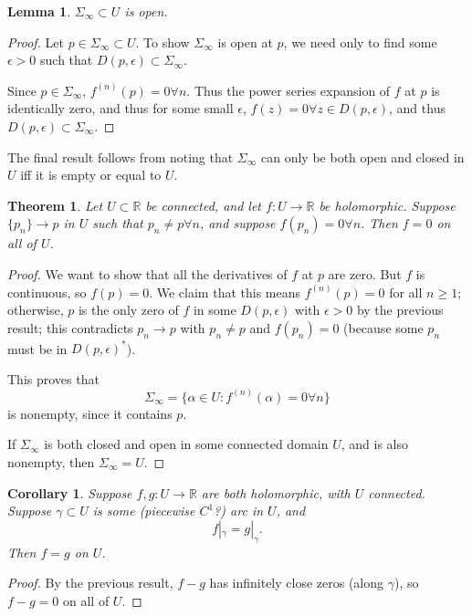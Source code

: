 \documentclass{artikel3}
\newcommand{\complex}{\mathbb{R}}
\newtheorem{lem}{Lemma}
\newtheorem{thm}{Theorem}
\newtheorem{cor}{Corollary}
\numberwithin{equation}{enumi}
\begin{document}
\begin{lem}
	$\Sigma_\infty\subset U$ is open.
\end{lem}
\begin{proof}
	Let $p\in \Sigma_\infty\subset U$.  To show $\Sigma_\infty$ is open at $p$,
	we need only to find some $\epsilon>0$ such that $D(p,\epsilon)\subset \Sigma_\infty$.
	
	Since $p\in \Sigma_\infty$, $f^{(n)}(p)=0\forall n$.  Thus the power
	series expansion of $f$ at $p$ is identically zero, and thus for some small $\epsilon$,
	$f(z)=0\forall z\in D(p,\epsilon)$, and thus $D(p,\epsilon)\subset \Sigma_\infty$.
\end{proof}

The final result follows from noting that $\Sigma_\infty$ can only be both
open and closed in $U$ iff it is empty or equal to $U$.

\begin{thm}
	Let $U\subset\complex$ be connected, and let $f:U\to\complex$ be holomorphic.
	Suppose $\{p_n\}\to p$ in $U$ such that $p_n\neq p\forall n$,
	and suppose $f(p_n)=0\forall n$.  Then $f=0$ on all of $U$.
\end{thm}
\begin{proof}
	We want to show that all the derivatives of $f$ at $p$ are zero.
	But $f$ is continuous, so $f(p)=0$.  We claim that this means
	$f^{(n)}(p)=0$ for all $n\geq 1$; otherwise, $p$
	is the only zero of $f$ in some $D(p,\epsilon)$ with $\epsilon>0$
	by the previous result; this contradicts $p_n\to p$ with $p_n\neq p$
	and $f(p_n)=0$ (because some $p_n$ must be in $D(p,\epsilon)^*$).
	
	This proves that \[
		\Sigma_\infty=\{\alpha\in U:f^{(n)}(\alpha)=0\forall n\}
	\] is nonempty, since it contains $p$.
	
	If $\Sigma_\infty$ is both closed and open in some connected domain
	$U$, and is also nonempty, then $\Sigma_\infty=U$.
\end{proof}

\begin{cor}
	Suppose $f,g:U\to\complex$ are both holomorphic, with $U$ connected.
	Suppose $\gamma\subset U$ is some (piecewise $C^1$?) arc in $U$, and \[
		f|_\gamma=g|_\gamma.
	\] Then $f=g$ on $U$.
\end{cor}
\begin{proof}
	By the previous result, $f-g$ has infinitely close zeros (along $\gamma$),
	so $f-g=0$ on all of $U$.
\end{proof}
\end{document}
